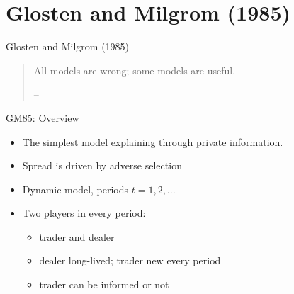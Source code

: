\documentclass[english,10pt
,aspectratio=169
]{beamer}
\begin{document}
\section{Glosten and Milgrom (1985)}

\begin{frame}{Glosten and Milgrom (1985)}
	\begin{quotation}
		All models are wrong; some models are useful.
		\begin{flushright}
			-- 
		\end{flushright}
	\end{quotation}
\end{frame}


\begin{frame}{GM85: Overview}
	\begin{itemize}
		\item The simplest model explaining  through private information.
		\item Spread is driven by adverse selection
		\item Dynamic model, periods $t = 1,2,...$
		\item Two players in every period:
		\begin{itemize}
			\item trader and dealer
			\item \alert{dealer} long-lived; trader new every period
			\item \alert{trader} can be informed or not
		\end{itemize}
	\end{itemize}
\end{frame}
\end{document}
